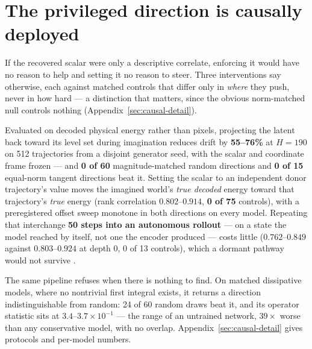 \section{The privileged direction is causally deployed}
\label{sec:causality}

If the recovered scalar were only a descriptive correlate, enforcing it would have no reason to help
and setting it no reason to steer. Three interventions say otherwise, each against matched controls
that differ only in \emph{where} they push, never in how hard --- a distinction that matters, since
the obvious norm-matched null controls nothing (Appendix~\ref{sec:causal-detail}).

Evaluated on decoded physical energy rather than pixels, projecting the latent back toward its level
set during imagination reduces drift by \textbf{55--76\%} at $H=190$ on 512 trajectories from a
disjoint generator seed, with the scalar and coordinate frame frozen --- and \textbf{0 of 60}
magnitude-matched random directions and \textbf{0 of 15} equal-norm tangent directions beat it.
Setting the scalar to an independent donor trajectory's value moves the imagined world's \emph{true
decoded} energy toward that trajectory's \emph{true} energy (rank correlation
$\mathbf{0.802}$--$\mathbf{0.914}$, \textbf{0 of 75} controls), with a preregistered offset sweep
monotone in both directions on every model. Repeating that interchange \textbf{50 steps into an
autonomous rollout} --- on a state the model reached by itself, not one the encoder produced --- costs
little ($0.762$--$0.849$ against $0.803$--$0.924$ at depth 0, 0 of 13 controls), which a dormant
pathway would not survive \citep{makelov2024illusion}.

The same pipeline refuses when there is nothing to find. On matched dissipative models, where no
nontrivial first integral exists, it returns a direction indistinguishable from random: 24 of 60
random draws beat it, and its operator statistic sits at $3.4$--$3.7\times10^{-1}$ --- the range of
an untrained network, $39\times$ worse than any conservative model, with no overlap.
Appendix~\ref{sec:causal-detail} gives protocols and per-model numbers.
